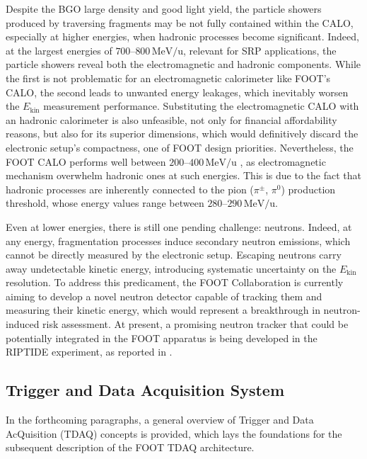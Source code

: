 Despite the BGO large density and good light yield, the particle showers produced by traversing fragments may be not fully contained within the CALO, especially at higher energies, when hadronic processes become significant. Indeed, at the largest energies of $700$--$800\,\mathrm{MeV/u}$, relevant for SRP applications, the particle showers reveal both the electromagnetic and hadronic components. While the first is not problematic for an electromagnetic calorimeter like FOOT's CALO, the second leads to unwanted energy leakages, which inevitably worsen the $E_\text{kin}$ measurement performance. Substituting the electromagnetic CALO with an hadronic calorimeter is also unfeasible, not only for financial affordability reasons, but also for its superior dimensions, which would definitively discard the electronic setup's compactness, one of FOOT design priorities. Nevertheless, the FOOT CALO performs well between $200$--$400\,\mathrm{MeV/u}$ \cite{measurement_impact_foot,UbaldiPhDThesis}, as electromagnetic mechanism overwhelm hadronic ones at such energies. This is due to the fact that hadronic processes are inherently connected to the pion ($\pi^{\pm}$, $\pi^0$) production threshold, whose energy values range between $280$--$290\,\mathrm{MeV/u}$.

Even at lower energies, there is still one pending challenge: neutrons. Indeed, at any energy, fragmentation processes induce secondary neutron emissions, which cannot be directly measured by the electronic setup. Escaping neutrons carry away undetectable kinetic energy, introducing systematic uncertainty on the $E_\text{kin}$ resolution. To address this predicament, the FOOT Collaboration is currently aiming to develop a novel neutron detector \cite{Zarrella_2024} capable of tracking them and measuring their kinetic energy, which would represent a breakthrough in neutron-induced risk assessment. At present, a promising neutron tracker that could be potentially integrated in the FOOT apparatus is being developed in the RIPTIDE experiment, as reported in \cite{Lanzi_2026}.
\subsection{Trigger and Data Acquisition System}\label{ssec:tdaq_electronic_setup}
In the forthcoming paragraphs, a general overview of Trigger and Data AcQuisition (TDAQ) concepts is provided, which lays the foundations for the subsequent description of the FOOT TDAQ architecture.
